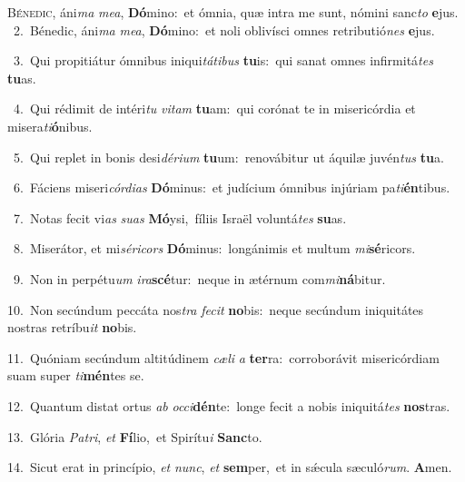 \lettrine{\initial\textcolor{\initialcolor}{B}}{énedic,} áni\textit{ma} \textit{me}\-\textit{a}, \textbf{Dó}\-mino:~\star et ómnia, quæ intra me sunt, nómini sanc\textit{to} \textbf{e}\-jus.\\
{\numbfont\textcolor{\numbcolor}{~2.}}~Bénedic, áni\textit{ma} \textit{me}\-\textit{a}, \textbf{Dó}\-mino:~\star et noli oblivísci omnes retributió\textit{nes} \textbf{e}\-jus.\par
{\numbfont\textcolor{\numbcolor}{~3.}}~Qui propitiátur ómnibus iniqui\-\textit{tá}\-\textit{ti}\textit{bus} \textbf{tu}\-is:~\star qui sanat omnes infirmitá\textit{tes} \textbf{tu}\-as.\par
{\numbfont\textcolor{\numbcolor}{~4.}}~Qui rédimit de intéri\textit{tu} \textit{vi}\-\textit{tam} \textbf{tu}\-am:~\star qui corónat te in misericórdia et misera\-\textit{ti}\-\textbf{ó}nibus.\par
{\numbfont\textcolor{\numbcolor}{~5.}}~Qui replet in bonis desi\-\textit{dé}\-\textit{ri}\textit{um} \textbf{tu}\-um:~\star renovábitur ut áquilæ juvén\textit{tus} \textbf{tu}\-a.\par
{\numbfont\textcolor{\numbcolor}{~6.}}~Fáciens miseri\-\textit{cór}\-\textit{di}\textit{as} \textbf{Dó}\-minus:~\star et judícium ómnibus injúriam pa\-\textit{ti}\-\textbf{én}tibus.\par
{\numbfont\textcolor{\numbcolor}{~7.}}~Notas fecit vi\textit{as} \textit{su}\-\textit{as} \textbf{Mó}\-ysi,~\star fíliis Israël voluntá\textit{tes} \textbf{su}\-as.\par
{\numbfont\textcolor{\numbcolor}{~8.}}~Miserátor, et mi\-\textit{sé}\-\textit{ri}\textit{cors} \textbf{Dó}\-minus:~\star longánimis et multum \textit{mi}\-\textbf{sé}ricors.\par
{\numbfont\textcolor{\numbcolor}{~9.}}~Non in perpétu\textit{um} \textit{i}\-\textit{ra}\textbf{scé}tur:~\star neque in ætérnum com\-\textit{mi}\-\textbf{ná}bitur.\par
{\numbfont\textcolor{\numbcolor}{10.}}~Non secúndum peccáta nos\textit{tra} \textit{fe}\-\textit{cit} \textbf{no}\-bis:~\star neque secúndum iniquitátes nostras retríbu\textit{it} \textbf{no}\-bis.\par
{\numbfont\textcolor{\numbcolor}{11.}}~Quóniam secúndum altitúdinem \textit{cæ}\-\textit{li} \textit{a} \textbf{ter}\-ra:~\star corroborávit misericórdiam suam super \textit{ti}\-\textbf{mén}tes se.\par
{\numbfont\textcolor{\numbcolor}{12.}}~Quantum distat ortus \textit{ab} \textit{oc}\-\textit{ci}\textbf{dén}te:~\star longe fecit a nobis iniquitá\textit{tes} \textbf{nos}\-tras.\par
{\numbfont\textcolor{\numbcolor}{13.}}~Glória \textit{Pa}\-\textit{tri}, \textit{et} \textbf{Fí}\-lio,~\star et Spirítu\textit{i} \textbf{Sanc}\-to.\par
{\numbfont\textcolor{\numbcolor}{14.}}~Sicut erat in princípio, \textit{et} \textit{nunc}\-, \textit{et} \textbf{sem}\-per,~\star et in sǽcula sæculó\-\textit{rum}\-. \textbf{A}\-men.\par
